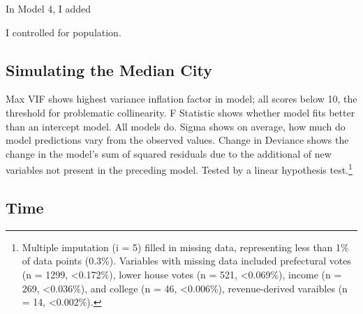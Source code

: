 \documentclass[preprint, 3p,
authoryear]{elsarticle} %
\begin{document}
In Model 4, I added

I controlled for population.

\hypertarget{simulating-the-median-city}{%
\subsection{Simulating the Median
City}\label{simulating-the-median-city}}

Max VIF shows highest variance inflation factor in model; all scores
below 10, the threshold for problematic collinearity. F Statistic shows
whether model fits better than an intercept model. All models do. Sigma
shows on average, how much do model predictions vary from the observed
values. Change in Deviance shows the change in the model's sum of
squared residuals due to the additional of new variables not present in
the preceding model. Tested by a linear hypothesis test.\footnote{Multiple
  imputation (i = 5) filled in missing data, representing less than 1\%
  of data points (0.3\%). Variables with missing data included
  prefectural votes (n = 1299, \textless0.172\%), lower house votes (n =
  521, \textless0.069\%), income (n = 269, \textless0.036\%), and
  college (n = 46, \textless0.006\%), revenue-derived varaibles (n = 14,
  \textless0.002\%).}

\hypertarget{time}{%
\subsection{Time}\label{time}}

\newpage
\renewcommand{\baselinestretch}{0.5}\selectfont
\renewcommand{\arraystretch}{1.5}

\begingroup\fontsize{9}{11}\selectfont
\end{document}
